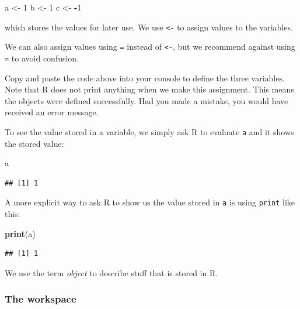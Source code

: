 \documentclass[
]{article}
\newenvironment{Shaded}{\begin{snugshade}}{\end{snugshade}}
\newcommand{\DecValTok}[1]{\textcolor[rgb]{0.00,0.00,0.81}{#1}}
\newcommand{\FunctionTok}[1]{\textcolor[rgb]{0.13,0.29,0.53}{\textbf{#1}}}
\newcommand{\NormalTok}[1]{#1}
\newcommand{\OtherTok}[1]{\textcolor[rgb]{0.56,0.35,0.01}{#1}}
\newcommand{\SpecialCharTok}[1]{\textcolor[rgb]{0.81,0.36,0.00}{\textbf{#1}}}
\begin{document}
\begin{Shaded}
\begin{Highlighting}[]
\NormalTok{a }\OtherTok{\textless{}{-}} \DecValTok{1}
\NormalTok{b }\OtherTok{\textless{}{-}} \DecValTok{1}
\NormalTok{c }\OtherTok{\textless{}{-}} \SpecialCharTok{{-}}\DecValTok{1}
\end{Highlighting}
\end{Shaded}

which stores the values for later use. We use \texttt{\textless{}-} to
assign values to the variables.

We can also assign values using \texttt{=} instead of
\texttt{\textless{}-}, but we recommend against using \texttt{=} to
avoid confusion.

Copy and paste the code above into your console to define the three
variables. Note that R does not print anything when we make this
assignment. This means the objects were defined successfully. Had you
made a mistake, you would have received an error message.

To see the value stored in a variable, we simply ask R to evaluate
\texttt{a} and it shows the stored value:

\begin{Shaded}
\begin{Highlighting}[]
\NormalTok{a}
\end{Highlighting}
\end{Shaded}

\begin{verbatim}
## [1] 1
\end{verbatim}

A more explicit way to ask R to show us the value stored in \texttt{a}
is using \texttt{print} like this:

\begin{Shaded}
\begin{Highlighting}[]
\FunctionTok{print}\NormalTok{(a)}
\end{Highlighting}
\end{Shaded}

\begin{verbatim}
## [1] 1
\end{verbatim}

We use the term \emph{object} to describe stuff that is stored in R.

\subsubsection{The workspace}\label{the-workspace}
\end{document}
